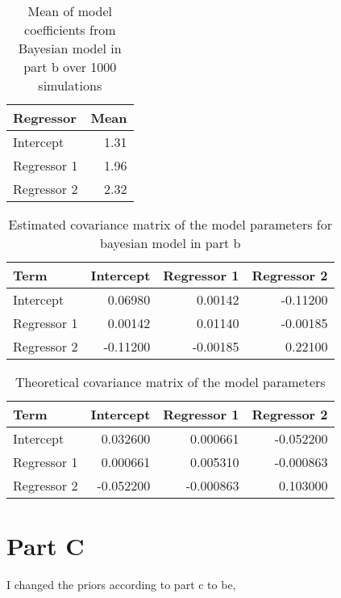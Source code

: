 \documentclass[]{book}
\begin{document}
\begin{table}

\caption{\label{tab:bayes-b-mean-coefs-q3}Mean of model coefficients from Bayesian model in part b over 1000 simulations}
\centering
\begin{tabular}[t]{lr}
\toprule
Regressor & Mean\\
\midrule
Intercept & 1.31\\
Regressor 1 & 1.96\\
Regressor 2 & 2.32\\
\bottomrule
\end{tabular}
\end{table}

\begin{table}

\caption{\label{tab:bayes-b-est-vcov-q3}Estimated covariance matrix of the model parameters for bayesian model in part b}
\centering
\begin{tabular}[t]{lrrr}
\toprule
Term & Intercept & Regressor 1 & Regressor 2\\
\midrule
Intercept & 0.06980 & 0.00142 & -0.11200\\
Regressor 1 & 0.00142 & 0.01140 & -0.00185\\
Regressor 2 & -0.11200 & -0.00185 & 0.22100\\
\bottomrule
\end{tabular}
\end{table}

\begin{table}

\caption{\label{tab:theory-vcov-b-q3}Theoretical covariance matrix of the model parameters}
\centering
\begin{tabular}[t]{lrrr}
\toprule
Term & Intercept & Regressor 1 & Regressor 2\\
\midrule
Intercept & 0.032600 & 0.000661 & -0.052200\\
Regressor 1 & 0.000661 & 0.005310 & -0.000863\\
Regressor 2 & -0.052200 & -0.000863 & 0.103000\\
\bottomrule
\end{tabular}
\end{table}

\hypertarget{part-c-2}{%
\section{Part C}\label{part-c-2}}

I changed the priors according to part c to be,
\end{document}
